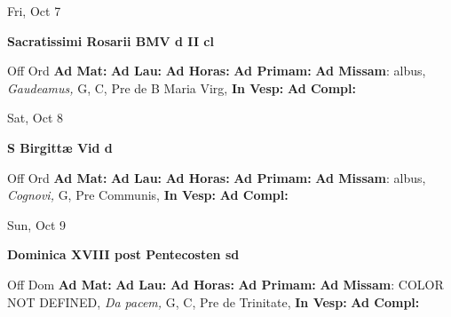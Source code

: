 \documentclass[10pt]{memoir}
\begin{document}
\begin{center}
\begin{minipage}{3.5in}
\vspace{2em}
\begin{center}Fri, Oct 7
\end{center}
\textbf{ \large Sacratissimi Rosarii BMV
\textnormal{\normalsize d II cl}}

\begin{justify}Off Ord
\textbf{Ad Mat: }
\textbf{Ad Lau: }
\textbf{Ad Horas: }
\textbf{Ad Primam: }\textbf{Ad Missam}: albus, \textit{Gaudeamus,} G, C, Pre de B Maria Virg, 
\textbf{In Vesp: }
\textbf{Ad Compl: }
\end{justify}
\end{minipage}
\end{center}

\begin{center}
\begin{minipage}{3.5in}
\vspace{2em}
\begin{center}Sat, Oct 8
\end{center}
\textbf{ \large S Birgittæ Vid
\textnormal{\normalsize d}}

\begin{justify}Off Ord
\textbf{Ad Mat: }
\textbf{Ad Lau: }
\textbf{Ad Horas: }
\textbf{Ad Primam: }\textbf{Ad Missam}: albus, \textit{Cognovi,} G, Pre Communis, 
\textbf{In Vesp: }
\textbf{Ad Compl: }
\end{justify}
\end{minipage}
\end{center}

\begin{center}
\begin{minipage}{3.5in}
\vspace{2em}
\begin{center}Sun, Oct 9
\end{center}
\textbf{ \large Dominica XVIII post Pentecosten
\textnormal{\normalsize sd}}

\begin{justify}Off Dom
\textbf{Ad Mat: }
\textbf{Ad Lau: }
\textbf{Ad Horas: }
\textbf{Ad Primam: }\textbf{Ad Missam}: COLOR NOT DEFINED, \textit{Da pacem,} G, C, Pre de Trinitate, 
\textbf{In Vesp: }
\textbf{Ad Compl: }
\end{justify}
\end{minipage}
\end{center}
\end{document}
